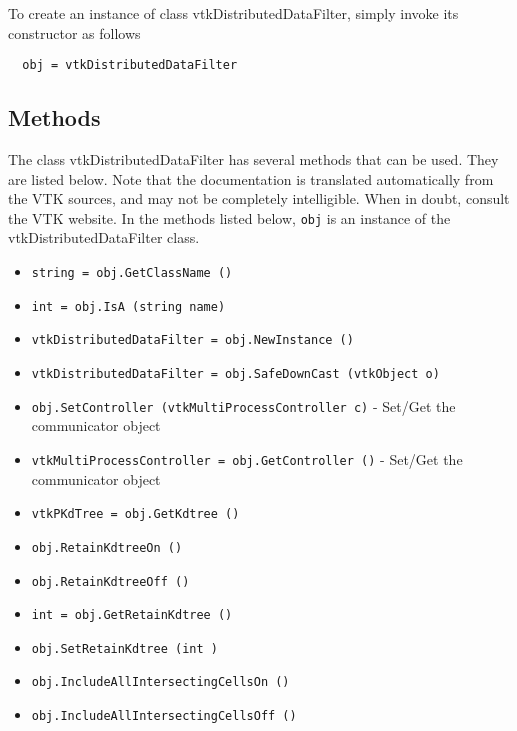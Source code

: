 To create an instance of class vtkDistributedDataFilter, simply
invoke its constructor as follows
\begin{verbatim}
  obj = vtkDistributedDataFilter
\end{verbatim}
\subsection{Methods}

The class vtkDistributedDataFilter has several methods that can be used.
  They are listed below.
Note that the documentation is translated automatically from the VTK sources,
and may not be completely intelligible.  When in doubt, consult the VTK website.
In the methods listed below, \verb|obj| is an instance of the vtkDistributedDataFilter class.
\begin{itemize}
\item  \verb|string = obj.GetClassName ()|

\item  \verb|int = obj.IsA (string name)|

\item  \verb|vtkDistributedDataFilter = obj.NewInstance ()|

\item  \verb|vtkDistributedDataFilter = obj.SafeDownCast (vtkObject o)|

\item  \verb|obj.SetController (vtkMultiProcessController c)| -    Set/Get the communicator object

\item  \verb|vtkMultiProcessController = obj.GetController ()| -    Set/Get the communicator object

\item  \verb|vtkPKdTree = obj.GetKdtree ()|

\item  \verb|obj.RetainKdtreeOn ()|

\item  \verb|obj.RetainKdtreeOff ()|

\item  \verb|int = obj.GetRetainKdtree ()|

\item  \verb|obj.SetRetainKdtree (int )|

\item  \verb|obj.IncludeAllIntersectingCellsOn ()|

\item  \verb|obj.IncludeAllIntersectingCellsOff ()|


\end{itemize}
